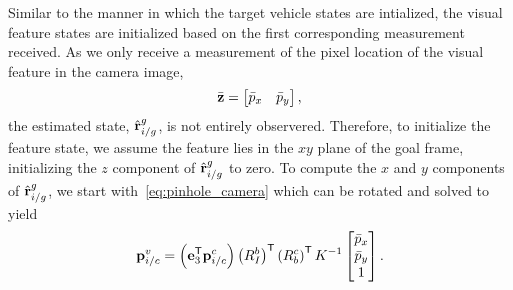 Similar to the manner in which the target vehicle states are intialized,
the visual feature states are initialized based on the first corresponding measurement received.
As we only receive a measurement of the pixel
location of the visual feature in the camera image,
\begin{equation}
  \bar{\mathrm{\mathbf{z}}} = \begin{bmatrix} \bar{p}_x & \bar{p}_y \end{bmatrix}
  \label{eq:pixel_meas},
\end{equation}
the estimated state, $\hat{\mathrm{\mathbf{r}}}_{i/g}^g$, is not entirely observered.
Therefore, to initialize
the feature state, we assume the feature lies in the $xy$ plane of the
goal frame, initializing the $z$ component of $\hat{\mathrm{\mathbf{r}}}_{i/g}^g$ to zero.
To compute the
$x$ and $y$ components of $\hat{\mathrm{\mathbf{r}}}_{i/g}^g$,
we start with~\eqref{eq:pinhole_camera}
which can be rotated and solved to yield
\begin{equation}
 \mathrm{\mathbf{p}}_{i/c}^v
  =
  \left( \mathrm{\mathbf{e}}_3^{\mathsf{T}} \mathrm{\mathbf{p}}_{i/c}^c \right) \left( R_I^b
  \right)^{\mathsf{T}} \left( R_b^c \right)^{\mathsf{T}} K^{-1} \begin{bmatrix}
    \bar{p}_x \\ \bar{p}_y \\ 1
  \end{bmatrix}.
\end{equation}
